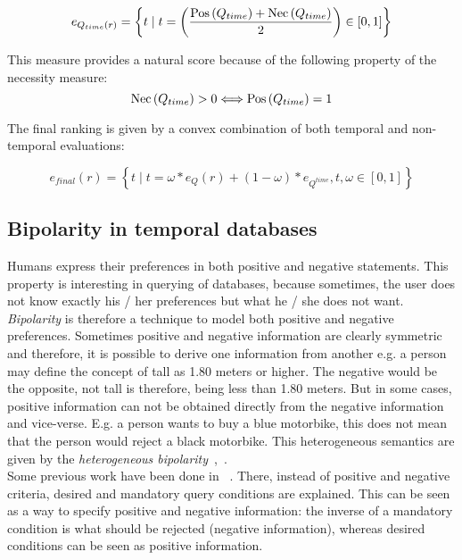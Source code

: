 \begin{equation}
\label{eq:temporal-eval}
e_{Q_{time} \left( r \right)} = \left \lbrace t \mid t = \left( \frac{\Pos \left( Q_{time}\right) + \Nec \left( Q_{time} \right)}{2} \right)   \in \left[ 0,1\right] \right \rbrace
\end{equation}

This measure provides a natural score because of the following property of the necessity measure: 
\begin{equation}
\label{eq:necessity} %
\Nec \left( Q_{time} \right) > 0  \Longleftrightarrow  \Pos \left( Q_{time}\right) = 1
\end{equation}

The final ranking is given by a convex combination of both temporal and non-temporal evaluations:

\begin{equation}
\label{eq:convex-combination}
e_{final} \left( r \right) = \left \lbrace t \mid t = \omega \ast e_{Q} \left( r \right) + \left( 1- \omega \right) \ast e_{Q^{time}}, t,\omega \in \left[0,1\right] \right \rbrace
\end{equation}




\subsection{Bipolarity in temporal databases}
\label{subsubsec:bipolarity}
Humans express their preferences in both positive and negative statements. This property is interesting in querying of databases, because sometimes, the user does not know exactly his / her preferences but what he / she does not want. \emph{Bipolarity} is therefore a technique to model both positive and negative preferences. Sometimes positive and negative information are clearly symmetric and therefore, it is possible to derive one information from another e.g. a person may define the concept of tall as 1.80 meters or higher. The negative would be the opposite, not tall is therefore, being less than 1.80 meters.  But in some cases, positive information can not be obtained directly from the negative information and vice-verse. E.g. a person wants to buy a blue motorbike, this does not mean that the person would reject a black motorbike. This heterogeneous semantics are given by the \emph{heterogeneous bipolarity}~\cite{Dubois2006},~\cite{Dubois2008}.\\

Some previous work have been done in ~\cite{Lacroix87}. There, instead of positive and negative criteria, desired and mandatory query conditions are explained. This can be seen as a way to specify positive and negative information: the inverse of a mandatory condition is what should be rejected (negative information), whereas desired conditions can be seen as positive information.\\


